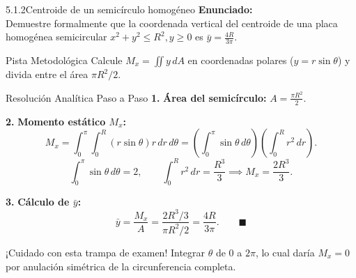 \documentclass[11pt,a4paper]{article}
\begin{document}
\begin{nivelbox}{5.1.2}{Centroide de un semicírculo homogéneo}
\textbf{Enunciado:}\\
Demuestre formalmente que la coordenada vertical del centroide de una placa homogénea semicircular $x^2 + y^2 \le R^2, y \ge 0$ es $\bar{y} = \frac{4R}{3\pi}$.

\begin{observacionbox}{Pista Metodológica}
Calcule $M_x = \iint y \, dA$ en coordenadas polares ($y = r\sin\theta$) y divida entre el área $\pi R^2 / 2$.
\end{observacionbox}

\begin{ejerciciobox}{Resolución Analítica Paso a Paso}
\smallskip\noindent\textbf{1.} \textbf{Área del semicírculo:} $A = \frac{\pi R^2}{2}$.

\smallskip\noindent\textbf{2.} \textbf{Momento estático $M_x$:}
\[M_x = \int_0^\pi \int_0^R (r\sin\theta) r \, dr \, d\theta = \left( \int_0^\pi \sin\theta \, d\theta \right) \left( \int_0^R r^2 \, dr \right).\]
\[\int_0^\pi \sin\theta \, d\theta = 2, \qquad \int_0^R r^2 \, dr = \frac{R^3}{3} \implies M_x = \frac{2R^3}{3}.\]

\smallskip\noindent\textbf{3.} \textbf{Cálculo de $\bar{y}$:}
\[\bar{y} = \frac{M_x}{A} = \frac{2R^3 / 3}{\pi R^2 / 2} = \frac{4R}{3\pi}. \qquad \blacksquare\]
\end{ejerciciobox}

\begin{errorbox}{¡Cuidado con esta trampa de examen!}
Integrar $\theta$ de $0$ a $2\pi$, lo cual daría $M_x = 0$ por anulación simétrica de la circunferencia completa.
\end{errorbox}
\end{nivelbox}
\bigskip
\end{document}
